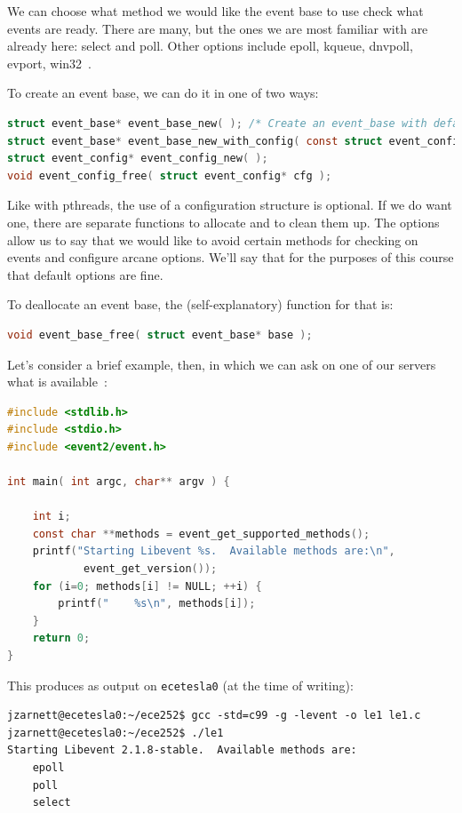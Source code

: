 \documentclass[a4paper]{report}
\begin{document}
We can choose what method we would like the event base to use check what events are ready. There are many, but the ones we are most familiar with are already here: select and poll. Other options include epoll, kqueue, dnvpoll, evport, win32~\cite{libevent}.

To create an event base, we can do it in one of two ways:
\begin{lstlisting}[language=C]
struct event_base* event_base_new( ); /* Create an event_base with default settings */
struct event_base* event_base_new_with_config( const struct event_config* cfg ); /* Create with configuration */
struct event_config* event_config_new( );
void event_config_free( struct event_config* cfg );
\end{lstlisting}

Like with pthreads, the use of a configuration structure is optional. If we do want one, there are separate functions to allocate and to clean them up. The options allow us to say that we would like to avoid certain methods for checking on events and configure arcane options. We'll say that for the purposes of this course that default options are fine.

To deallocate an event base, the (self-explanatory) function for that is:
\begin{lstlisting}[language=C]
void event_base_free( struct event_base* base );
\end{lstlisting}

Let's consider a brief example, then, in which we can ask on one of our servers what is available~\cite{libevent}:
\begin{lstlisting}[language=C]
#include <stdlib.h>
#include <stdio.h>
#include <event2/event.h>

int main( int argc, char** argv ) { 

    int i;
    const char **methods = event_get_supported_methods();
    printf("Starting Libevent %s.  Available methods are:\n",
            event_get_version());
    for (i=0; methods[i] != NULL; ++i) {
        printf("    %s\n", methods[i]);
    }   
    return 0;
}
\end{lstlisting}

This produces as output on \texttt{ecetesla0} (at the time of writing):
\begin{verbatim}
jzarnett@ecetesla0:~/ece252$ gcc -std=c99 -g -levent -o le1 le1.c
jzarnett@ecetesla0:~/ece252$ ./le1 
Starting Libevent 2.1.8-stable.  Available methods are:
    epoll
    poll
    select
\end{verbatim}
\end{document}
